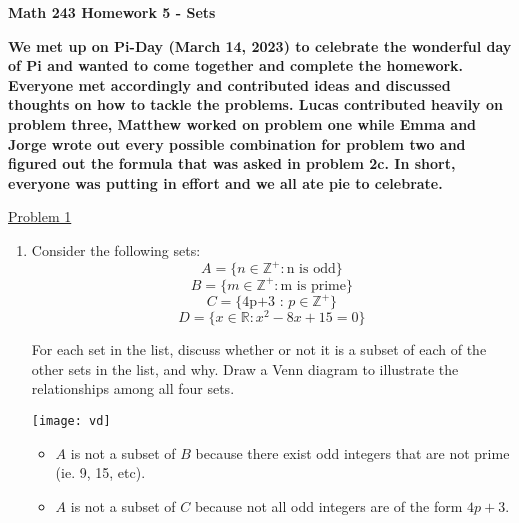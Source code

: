 \documentclass{article}
\newcommand{\R}{\mathbb{R}}
\newcommand{\Z}{\mathbb{Z}}
\begin{document}
\noindent\textbf{Math 243 \hfill Homework 5 - Sets}

\textbf{We met up on Pi-Day (March 14, 2023) to celebrate 
the wonderful day of Pi and wanted to come together and 
complete the homework. Everyone met accordingly and 
contributed ideas and discussed thoughts on how to tackle 
the problems. Lucas contributed heavily on problem three, 
Matthew worked on problem one while Emma and Jorge wrote 
out every possible combination for problem two and figured 
out the formula that was asked in problem 2c. In short, 
everyone was putting in effort and we all ate pie to 
celebrate.}

\pagebreak

\underline{Problem 1}

\begin{enumerate}
    \item Consider the following sets:
$$A = \{n \in \Z^+ : \text{n is odd}\}$$
$$B = \{m\in\Z^+:\text{m is prime}\}$$
$$C = \{\text{4p+3 : }p\in\Z^+\}$$
$$D = \{x\in\R: x^2-8x+15=0 \}$$

For each set in the list, discuss whether or not it is a subset of 
each of the other sets in the list, and why. Draw a Venn diagram to 
illustrate the relationships among all four sets.

\texttt{[image: vd]}
\begin{itemize}
    \small
    \item $A$ is not a subset of $B$ because there exist odd integers 
    that are not prime (ie. 9, 15, etc).
    \item $A$ is not a subset of $C$ because not all odd integers are 
    of the form $4p + 3$.
\end{itemize}



\end{enumerate}
\end{document}
